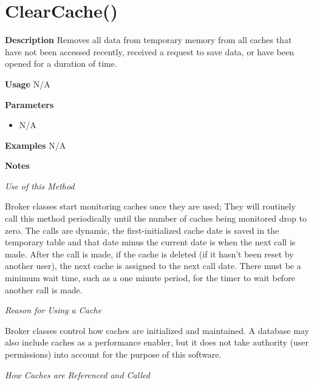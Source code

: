 \documentclass[letterpaper,12pt]{report}
\begin{document}
{
\pagebreak
\section{ClearCache()}
    \begin{description}
     \item \textbf{Description}
	\newline \hspace*{1cm} Removes all data from temporary memory from all caches that have not been accessed recently, received a request to save data, or have been opened for a duration of time.
     \item \textbf{Usage}
	\newline \hspace*{1cm} N/A
     \item \textbf{Parameters}
	 \begin{itemize}
	   \item N/A
	  \end{itemize}
     \item \textbf{Examples}
	\newline \hspace*{1cm} N/A
     \item \textbf{Notes}
	\par \noindent 
	\textit{Use of this Method} 
	\par \noindent \hspace*{1cm} Broker classes start monitoring caches once they are used; They will routinely call this method periodically until the number of caches being monitored drop to zero. The calls are dynamic, the first-initialized cache date is saved in the temporary table and that date minus the current date is when the next call is made. After the call is made, if the cache is deleted (if it hasn't been reset by another user), the next cache is assigned to the next call date. There must be a minimum wait time, such as a one minute period, for the timer to wait before another call is made.
	\par \noindent
	\textit{Reason for Using a Cache} 
	\par \noindent \hspace*{1cm} Broker classes control how caches are initialized and maintained. A database may also include caches as a performance enabler, but it does not take authority (user permissions) into account for the purpose of this software. 
	\par \noindent
	\textit{How Caches are Referenced and Called}

\end{description}}
\end{document}
